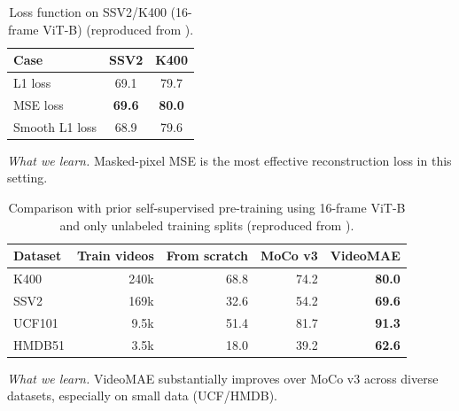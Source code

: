 \begin{enrichment}
\begin{enrichment}
    \begin{table}[H]
        \centering
        \small
        \setlength{\tabcolsep}{6pt}
        \caption{Loss function on SSV2/K400 (16-frame ViT-B) (reproduced from \cite{tong2022_videomae}).}
        \label{tab:videomae_tbl1f}
        \begin{tabular}{lcc}
            \toprule
            Case & SSV2 & K400 \\
            \midrule
            L1 loss        & 69.1 & 79.7 \\
            MSE loss       & \textbf{69.6} & \textbf{80.0} \\
            Smooth L1 loss & 68.9 & 79.6 \\
            \bottomrule
        \end{tabular}
    \end{table}
    \noindent\emph{What we learn.} Masked-pixel MSE is the most effective reconstruction loss in this setting.
    
    
    \begin{table}[H]
        \centering
        \small
        \setlength{\tabcolsep}{6pt}
        \caption{Comparison with prior self-supervised pre-training using 16-frame ViT-B and only unlabeled training splits (reproduced from \cite{tong2022_videomae}).}
        \label{tab:videomae_tbl2}
        \begin{tabular}{lrrrr}
            \toprule
            \textbf{Dataset} & \textbf{Train videos} & \textbf{From scratch} & \textbf{MoCo v3} & \textbf{VideoMAE} \\
            \midrule
            K400   & 240k & 68.8 & 74.2 & \textbf{80.0} \\
            SSV2   & 169k & 32.6 & 54.2 & \textbf{69.6} \\
            UCF101 & 9.5k & 51.4 & 81.7 & \textbf{91.3} \\
            HMDB51 & 3.5k & 18.0 & 39.2 & \textbf{62.6} \\
            \bottomrule
        \end{tabular}
    \end{table}
    \noindent\emph{What we learn.} VideoMAE substantially improves over MoCo v3 across diverse datasets, especially on small data (UCF/HMDB).
    
    

\end{enrichment}
\end{enrichment}
